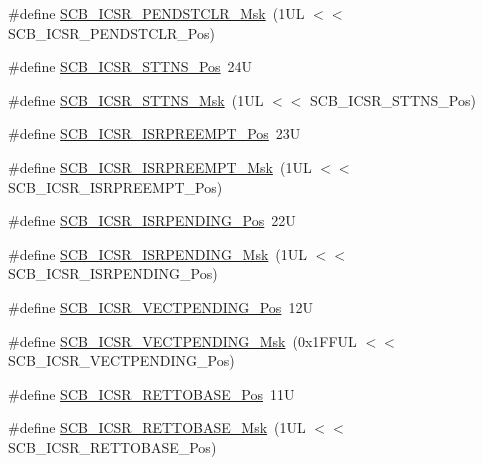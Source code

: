 \begin{DoxyCompactItemize}
\item 
\#define \mbox{\hyperlink{group___c_m_s_i_s___s_c_b_gab241827d2a793269d8cd99b9b28c2157}{S\+C\+B\+\_\+\+I\+C\+S\+R\+\_\+\+P\+E\+N\+D\+S\+T\+C\+L\+R\+\_\+\+Msk}}~(1\+U\+L $<$$<$ S\+C\+B\+\_\+\+I\+C\+S\+R\+\_\+\+P\+E\+N\+D\+S\+T\+C\+L\+R\+\_\+\+Pos)
\item 
\#define \mbox{\hyperlink{group___c_m_s_i_s___s_c_b_ga021591700b2d6a6e332d932efaece42b}{S\+C\+B\+\_\+\+I\+C\+S\+R\+\_\+\+S\+T\+T\+N\+S\+\_\+\+Pos}}~24U
\item 
\#define \mbox{\hyperlink{group___c_m_s_i_s___s_c_b_ga70404175bcf7f329758829a9888e48c4}{S\+C\+B\+\_\+\+I\+C\+S\+R\+\_\+\+S\+T\+T\+N\+S\+\_\+\+Msk}}~(1\+U\+L $<$$<$ S\+C\+B\+\_\+\+I\+C\+S\+R\+\_\+\+S\+T\+T\+N\+S\+\_\+\+Pos)
\item 
\#define \mbox{\hyperlink{group___c_m_s_i_s___s_c_b_ga11cb5b1f9ce167b81f31787a77e575df}{S\+C\+B\+\_\+\+I\+C\+S\+R\+\_\+\+I\+S\+R\+P\+R\+E\+E\+M\+P\+T\+\_\+\+Pos}}~23U
\item 
\#define \mbox{\hyperlink{group___c_m_s_i_s___s_c_b_gaa966600396290808d596fe96e92ca2b5}{S\+C\+B\+\_\+\+I\+C\+S\+R\+\_\+\+I\+S\+R\+P\+R\+E\+E\+M\+P\+T\+\_\+\+Msk}}~(1\+U\+L $<$$<$ S\+C\+B\+\_\+\+I\+C\+S\+R\+\_\+\+I\+S\+R\+P\+R\+E\+E\+M\+P\+T\+\_\+\+Pos)
\item 
\#define \mbox{\hyperlink{group___c_m_s_i_s___s_c_b_ga10749d92b9b744094b845c2eb46d4319}{S\+C\+B\+\_\+\+I\+C\+S\+R\+\_\+\+I\+S\+R\+P\+E\+N\+D\+I\+N\+G\+\_\+\+Pos}}~22U
\item 
\#define \mbox{\hyperlink{group___c_m_s_i_s___s_c_b_ga056d74fd538e5d36d3be1f28d399c877}{S\+C\+B\+\_\+\+I\+C\+S\+R\+\_\+\+I\+S\+R\+P\+E\+N\+D\+I\+N\+G\+\_\+\+Msk}}~(1\+U\+L $<$$<$ S\+C\+B\+\_\+\+I\+C\+S\+R\+\_\+\+I\+S\+R\+P\+E\+N\+D\+I\+N\+G\+\_\+\+Pos)
\item 
\#define \mbox{\hyperlink{group___c_m_s_i_s___s_c_b_gada60c92bf88d6fd21a8f49efa4a127b8}{S\+C\+B\+\_\+\+I\+C\+S\+R\+\_\+\+V\+E\+C\+T\+P\+E\+N\+D\+I\+N\+G\+\_\+\+Pos}}~12U
\item 
\#define \mbox{\hyperlink{group___c_m_s_i_s___s_c_b_gacb6992e7c7ddc27a370f62878a21ef72}{S\+C\+B\+\_\+\+I\+C\+S\+R\+\_\+\+V\+E\+C\+T\+P\+E\+N\+D\+I\+N\+G\+\_\+\+Msk}}~(0x1\+F\+F\+U\+L $<$$<$ S\+C\+B\+\_\+\+I\+C\+S\+R\+\_\+\+V\+E\+C\+T\+P\+E\+N\+D\+I\+N\+G\+\_\+\+Pos)
\item 
\#define \mbox{\hyperlink{group___c_m_s_i_s___s_c_b_ga403d154200242629e6d2764bfc12a7ec}{S\+C\+B\+\_\+\+I\+C\+S\+R\+\_\+\+R\+E\+T\+T\+O\+B\+A\+S\+E\+\_\+\+Pos}}~11U
\item 
\#define \mbox{\hyperlink{group___c_m_s_i_s___s_c_b_gaca6fc3f79bb550f64fd7df782ed4a5f6}{S\+C\+B\+\_\+\+I\+C\+S\+R\+\_\+\+R\+E\+T\+T\+O\+B\+A\+S\+E\+\_\+\+Msk}}~(1\+U\+L $<$$<$ S\+C\+B\+\_\+\+I\+C\+S\+R\+\_\+\+R\+E\+T\+T\+O\+B\+A\+S\+E\+\_\+\+Pos)

\end{DoxyCompactItemize}
